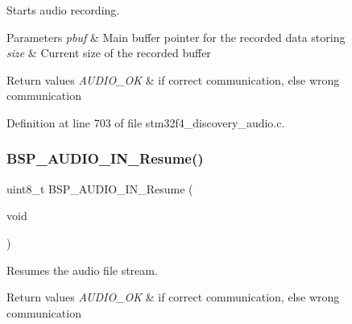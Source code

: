 Starts audio recording. 


\begin{DoxyParams}{Parameters}
{\em pbuf} & Main buffer pointer for the recorded data storing ~\newline
\\
\hline
{\em size} & Current size of the recorded buffer \\
\hline
\end{DoxyParams}

\begin{DoxyRetVals}{Return values}
{\em A\+U\+D\+I\+O\+\_\+\+OK} & if correct communication, else wrong communication \\
\hline
\end{DoxyRetVals}


Definition at line 703 of file stm32f4\+\_\+discovery\+\_\+audio.\+c.

\mbox{\label{group___s_t_m32_f4___d_i_s_c_o_v_e_r_y___a_u_d_i_o___i_n___private___functions_gadf7a4308129a18f4a3c22adb6f543d01}} 
\subsubsection{\texorpdfstring{B\+S\+P\+\_\+\+A\+U\+D\+I\+O\+\_\+\+I\+N\+\_\+\+Resume()}{BSP\_AUDIO\_IN\_Resume()}}
{\footnotesize\ttfamily uint8\+\_\+t B\+S\+P\+\_\+\+A\+U\+D\+I\+O\+\_\+\+I\+N\+\_\+\+Resume (\begin{DoxyParamCaption}\item[{void}]{ }\end{DoxyParamCaption})}



Resumes the audio file stream. ~\newline
 


\begin{DoxyRetVals}{Return values}
{\em A\+U\+D\+I\+O\+\_\+\+OK} & if correct communication, else wrong communication \\
\hline
\end{DoxyRetVals}


